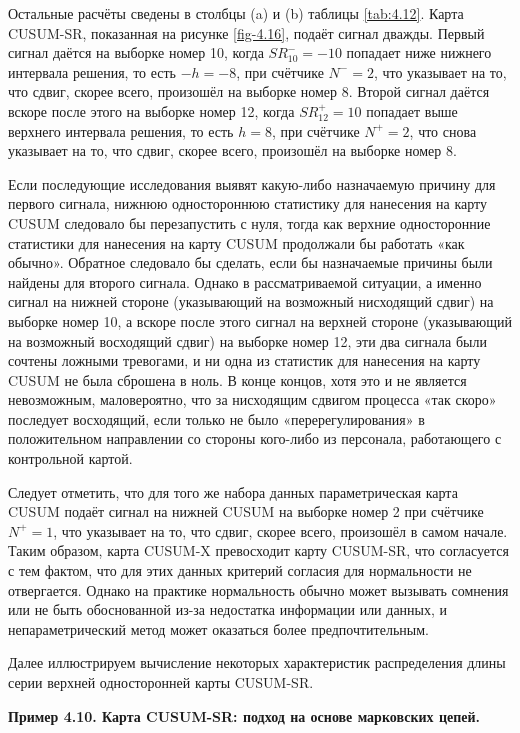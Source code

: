 Остальные расчёты сведены в столбцы (a) и (b) таблицы \ref{tab:4.12}. Карта CUSUM-SR, показанная на рисунке \ref{fig-4.16}, подаёт сигнал дважды. Первый сигнал даётся на выборке номер 10, когда \(SR_{10}^- = -10\) попадает ниже нижнего интервала решения, то есть \(-h = -8\), при счётчике \(N^- = 2\), что указывает на то, что сдвиг, скорее всего, произошёл на выборке номер 8. Второй сигнал даётся вскоре после этого на выборке номер 12, когда \(SR_{12}^+ = 10\) попадает выше верхнего интервала решения, то есть \(h = 8\), при счётчике \(N^+ = 2\), что снова указывает на то, что сдвиг, скорее всего, произошёл на выборке номер 8.

Если последующие исследования выявят какую-либо назначаемую причину для первого сигнала, нижнюю одностороннюю статистику для нанесения на карту CUSUM следовало бы перезапустить с нуля, тогда как верхние односторонние статистики для нанесения на карту CUSUM продолжали бы работать «как обычно». Обратное следовало бы сделать, если бы назначаемые причины были найдены для второго сигнала. Однако в рассматриваемой ситуации, а именно сигнал на нижней стороне (указывающий на возможный нисходящий сдвиг) на выборке номер 10, а вскоре после этого сигнал на верхней стороне (указывающий на возможный восходящий сдвиг) на выборке номер 12, эти два сигнала были сочтены ложными тревогами, и ни одна из статистик для нанесения на карту CUSUM не была сброшена в ноль. В конце концов, хотя это и не является невозможным, маловероятно, что за нисходящим сдвигом процесса «так скоро» последует восходящий, если только не было «перерегулирования» в положительном направлении со стороны кого-либо из персонала, работающего с контрольной картой.

Следует отметить, что для того же набора данных параметрическая карта CUSUM подаёт сигнал на нижней CUSUM на выборке номер 2 при счётчике \(N^+ = 1\), что указывает на то, что сдвиг, скорее всего, произошёл в самом начале. Таким образом, карта CUSUM-X превосходит карту CUSUM-SR, что согласуется с тем фактом, что для этих данных критерий согласия для нормальности не отвергается. Однако на практике нормальность обычно может вызывать сомнения или не быть обоснованной из-за недостатка информации или данных, и непараметрический метод может оказаться более предпочтительным.

Далее иллюстрируем вычисление некоторых характеристик распределения длины серии верхней односторонней карты CUSUM-SR.

\noindent\textbf{Пример 4.10. Карта CUSUM-SR: подход на основе марковских цепей.}

